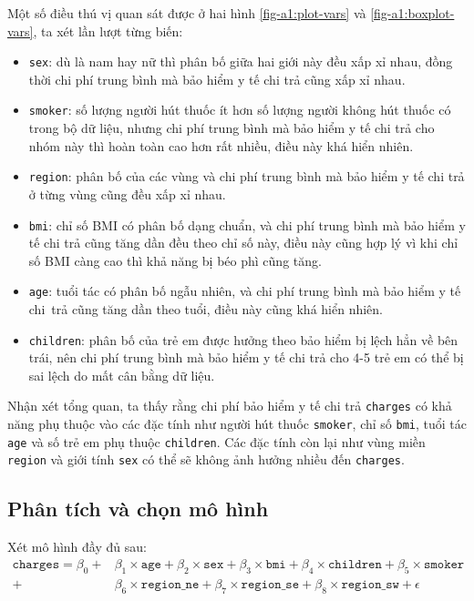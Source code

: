 Một số điều thú vị quan sát được ở hai hình \ref{fig-a1:plot-vars} và \ref{fig-a1:boxplot-vars}, ta xét lần lượt từng biến:
\begin{itemize}
	\item \texttt{sex}: dù là nam hay nữ thì phân bố giữa hai giới này đều xấp xỉ nhau, đồng thời chi phí trung bình mà bảo hiểm y tế chi trả cũng xấp xỉ nhau.
	\item \texttt{smoker}: số lượng người hút thuốc ít hơn số lượng người không hút thuốc có trong bộ dữ liệu, nhưng chi phí trung bình mà bảo hiểm y tế chi trả cho nhóm này thì hoàn toàn cao hơn rất nhiều, điều này khá hiển nhiên.
	\item \texttt{region}: phân bố của các vùng và chi phí trung bình mà bảo hiểm y tế chi trả ở từng vùng cũng đều xấp xỉ nhau. 
	\item \texttt{bmi}: chỉ số BMI có phân bố dạng chuẩn, và chi phí trung bình mà bảo hiểm y tế chi trả cũng tăng dần đều theo chỉ số này, điều này cũng hợp lý vì khi chỉ số BMI càng cao thì khả năng bị béo phì cũng tăng. 
	\item \texttt{age}: tuổi tác có phân bố ngẫu nhiên, và chi phí trung bình mà bảo hiểm y tế chi~trả cũng tăng dần theo tuổi, điều này cũng khá hiển nhiên.
	\item \texttt{children}: phân bố của trẻ em được hưởng theo bảo hiểm bị lệch hẳn về bên trái, nên chi phí trung bình mà bảo hiểm y tế chi trả cho 4-5 trẻ em có thể bị sai lệch do mất cân bằng dữ liệu.
\end{itemize}

Nhận xét tổng quan, ta thấy rằng chi phí bảo hiểm y tế chi trả \texttt{charges} có khả năng phụ thuộc vào các đặc tính như người hút thuốc \texttt{smoker}, chỉ số \texttt{bmi}, tuổi tác \texttt{age} và số trẻ em phụ thuộc \texttt{children}. Các đặc tính còn lại như vùng miền \texttt{region} và giới tính \texttt{sex} có thể sẽ không ảnh hưởng nhiều đến \texttt{charges}.

\subsection*{Phân tích và chọn mô hình}

Xét mô hình đầy đủ sau:
\begin{equation}\label{a1-model-full}
	\begin{split}
		\texttt{charges} = \beta_0 + &\beta_1 \times \texttt{age} + \beta_2 \times \texttt{sex} + \beta_3 \times \texttt{bmi} + \beta_4 \times \texttt{children} + \beta_5 \times \texttt{smoker}\\ + &\beta_6 \times \texttt{region\_ne} + \beta_7 \times \texttt{region\_se} + \beta_8 \times \texttt{region\_sw} + \epsilon
	\end{split}
\end{equation}

